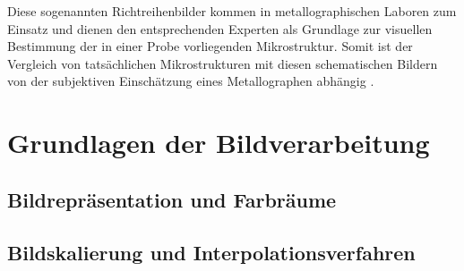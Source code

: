 \documentclass[
fontsize=10pt, 
listof = totoc,
parskip = half	
]{report}
\begin{document}
\noindent Diese sogenannten Richtreihenbilder kommen in metallographischen Laboren zum Einsatz und dienen den entsprechenden Experten als Grundlage zur visuellen Bestimmung der in einer Probe vorliegenden Mikrostruktur. Somit ist der Vergleich von tatsächlichen Mikrostrukturen mit diesen schematischen Bildern von der subjektiven Einschätzung eines Metallographen abhängig \cite[Seite 27]{ISO945}.

\section{Grundlagen der Bildverarbeitung}
\label{GrundlagenBildverarbeitung}

\subsection{Bildrepräsentation und Farbräume}
\label{Bildrep}

\subsection{Bildskalierung und Interpolationsverfahren}
\label{subsec:SkalierungUndInterpolation}
\end{document}
